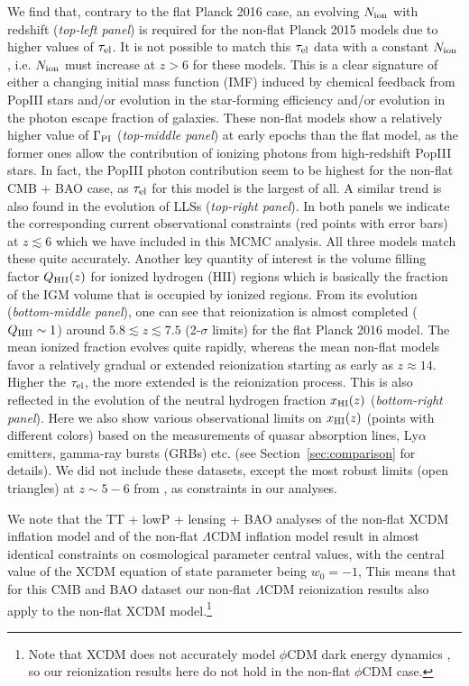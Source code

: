 \documentclass[useAMS,usenatbib]{mnras}
\begin{document}
We find that, contrary to the flat Planck 2016 case, an evolving $N_{\rm ion}$ 
with redshift ({\it top-left panel})
is required for the non-flat Planck 2015 models due to higher values of $\tau_{\rm el}$. It is not possible to match
this $\tau_{\rm el}$ data with a constant $N_{\rm ion}$, i.e. $N_{\rm ion}$ must increase at $z >6$
for these models. This is a clear signature of either a changing initial
mass function (IMF) induced by chemical feedback from PopIII stars
and/or evolution in the star-forming efficiency and/or evolution in the 
photon escape fraction of galaxies.
These non-flat models show a relatively higher value of $\Gamma_{\rm PI}$ ({\it top-middle panel})
at early epochs than the flat model, as the former ones allow the contribution 
of ionizing photons from high-redshift PopIII stars. In fact, the PopIII 
photon contribution seem to be 
highest for the non-flat CMB + BAO case, as $\tau_{\rm el}$ for this model is 
the largest of all. A similar trend is also found in the evolution
of LLSs ({\it top-right panel}). In both panels we indicate the corresponding current observational constraints
(red points with error bars) at $z\lesssim6$ which we have included in this MCMC analysis.
All three models match these quite accurately. Another key quantity of interest is the volume filling factor
$Q_{\rm HII}(z)$ for ionized hydrogen (HII) regions which is basically the fraction of the IGM
volume that is occupied by ionized regions.
From its evolution ({\it bottom-middle panel}), one can see that reionization is almost completed
($Q_{\rm HII}\sim1$) around $5.8\lesssim z\lesssim7.5$ (2-$\sigma$ limits) for 
the flat Planck 2016 model.
The mean ionized fraction evolves quite rapidly, whereas the mean non-flat models favor a relatively gradual
or extended reionization starting as early as $z\approx14$. Higher the 
$\tau_{\rm el}$, the more extended is the reionization process. This is also reflected in the
evolution of the neutral hydrogen fraction $x_{\rm HI}(z)$
({\it bottom-right panel}). Here we also show various observational limits on $x_{\rm HI}(z)$ (points with different colors)
based on the measurements of quasar absorption lines, Ly$\alpha$ emitters, gamma-ray bursts (GRBs) etc.
(see Section~\ref{sec:comparison} for details). We did not include these datasets, except the most 
robust limits (open triangles) at $z\sim5-6$ from \cite{2015MNRAS.447..499M}, 
as constraints in our analyses.

We note that the TT + lowP + lensing + BAO analyses of the non-flat XCDM 
inflation model \citep{2017arXiv171003271O} and of the non-flat 
$\Lambda$CDM inflation model \citep{2017arXiv170703452O} result in almost 
identical constraints on cosmological parameter central values, with the 
central value of the XCDM equation of state parameter being $w_0 = -1$, 
This means that for this CMB and BAO dataset our non-flat $\Lambda$CDM 
reionization results also apply to the non-flat XCDM model.\footnote{Note 
that XCDM does not accurately model $\phi$CDM \citep{1988ApJ...325L..17P,1988PhRvD..37.3406R}
dark energy dynamics \citep{2000ApJ...532..109P}, so our 
reionization results here do not hold in the non-flat $\phi$CDM case.}  
\end{document}
